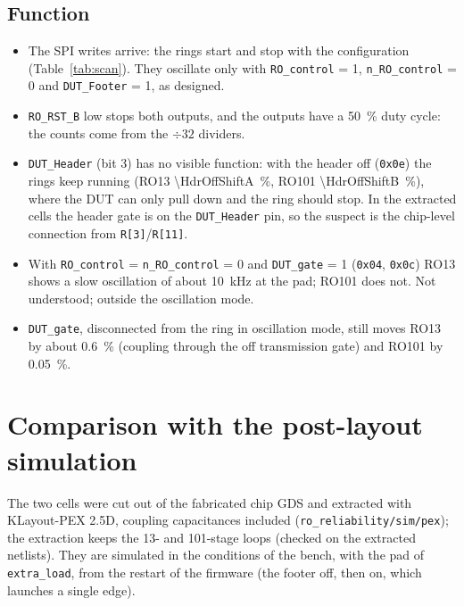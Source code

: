 \subsection{Function}
\begin{itemize}
  \item The SPI writes arrive: the rings start and stop with the configuration (Table~\ref{tab:scan}).
        They oscillate only with \texttt{RO\_control} = 1, \texttt{n\_RO\_control} = 0 and
        \texttt{DUT\_Footer} = 1, as designed.
  \item \texttt{RO\_RST\_B} low stops both outputs, and the outputs have a \SI{50}{\percent} duty cycle:
        the counts come from the $\div 32$ dividers.
  \item \texttt{DUT\_Header} (bit 3) has no visible function: with the header off (\texttt{0x0e}) the
        rings keep running (RO13 \SI{\HdrOffShiftA}{\percent}, RO101 \SI{\HdrOffShiftB}{\percent}),
        where the DUT can only pull down and the ring should stop. In the extracted cells the header
        gate is on the \texttt{DUT\_Header} pin, so the suspect is the chip-level connection from
        \texttt{R[3]}/\texttt{R[11]}.
  \item With \texttt{RO\_control} = \texttt{n\_RO\_control} = 0 and \texttt{DUT\_gate} = 1
        (\texttt{0x04}, \texttt{0x0c}) RO13 shows a slow oscillation of about \SI{10}{kHz} at the pad;
        RO101 does not. Not understood; outside the oscillation mode.
  \item \texttt{DUT\_gate}, disconnected from the ring in oscillation mode, still moves RO13 by about
        \SI{0.6}{\percent} (coupling through the off transmission gate) and RO101 by \SI{0.05}{\percent}.
\end{itemize}

\begin{table}[H]\centering\scriptsize

\caption{Configuration scan: pad edges per second of both rings for every value of the 4 bits of
the RO register (written to both rings), from a ring-open state.}
\label{tab:scan}
\end{table}

\ifdefined\HavePex
\section{Comparison with the post-layout simulation}
\label{sec:cmp}
The two cells were cut out of the fabricated chip GDS and extracted with KLayout-PEX 2.5D, coupling
capacitances included (\texttt{ro\_reliability/sim/pex}); the extraction keeps the 13- and 101-stage
loops (checked on the extracted netlists). They are simulated in the conditions of the bench, with the
pad of \texttt{extra\_load}, from the restart of the firmware (the footer off, then on, which launches a
single edge).
\begin{table}[H]\centering\small

\caption{Ring frequency: simulation against the board (pad $\times$ 32, ring alone).}
\label{tab:cmpcases}
\end{table}

